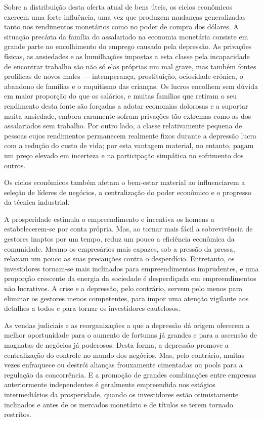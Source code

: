\documentclass[12pt]{article}
\begin{document}
Sobre a distribuição desta oferta atual de bens úteis, os ciclos econômicos exercem uma forte influência, uma vez que produzem mudanças generalizadas tanto nos rendimentos monetários como no poder de compra dos dólares. A situação precária da família do assalariado na economia monetária consiste em grande parte no encolhimento do emprego causado pela depressão. As privações físicas, as ansiedades e as humilhações impostas a esta classe pela incapacidade de encontrar trabalho são não só elas próprias um mal grave, mas também fontes prolíficas de novos males — intemperança, prostituição, ociosidade crónica, o abandono de famílias e o raquitismo das crianças. Os lucros encolhem sem dúvida em maior proporção do que os salários, e muitas famílias que retiram o seu rendimento desta fonte são forçadas a adotar economias dolorosas e a suportar muita ansiedade, embora raramente sofram privações tão extremas como as dos assalariados sem trabalho. Por outro lado, a classe relativamente pequena de pessoas cujos rendimentos permanecem realmente fixos durante a depressão lucra com a redução do custo de vida; por esta vantagem material, no entanto, pagam um preço elevado em incerteza e na participação simpática no sofrimento dos outros.

Os ciclos econômicos também afetam o bem-estar material ao influenciarem a seleção de líderes de negócios, a centralização do poder econômico e o progresso da técnica industrial.

A prosperidade estimula o empreendimento e incentiva os homens a estabelecerem-se por conta própria. Mas, ao tornar mais fácil a sobrevivência de gestores inaptos por um tempo, reduz um pouco a eficiência econômica da comunidade. Mesmo os empresários mais capazes, sob a pressão da pressa, relaxam um pouco as suas precauções contra o desperdício. Entretanto, os investidores tornam-se mais inclinados para empreendimentos imprudentes, e uma proporção crescente da energia da sociedade é desperdiçada em empreendimentos não lucrativos. A crise e a depressão, pelo contrário, servem pelo menos para eliminar os gestores menos competentes, para impor uma atenção vigilante aos detalhes a todos e para tornar os investidores cautelosos.

As vendas judiciais e as reorganizações a que a depressão dá origem oferecem a melhor oportunidade para o aumento de fortunas já grandes e para a ascensão de magnatas de negócios já poderosos. Desta forma, a depressão promove a centralização do controle no mundo dos negócios. Mas, pelo contrário, muitas vezes enfraquece ou destrói alianças frouxamente cimentadas ou pools para a regulação da concorrência. E a promoção de grandes combinações entre empresas anteriormente independentes é geralmente empreendida nos estágios intermediários da prosperidade, quando os investidores estão otimistamente inclinados e antes de os mercados monetário e de títulos se terem tornado restritos.
\end{document}
